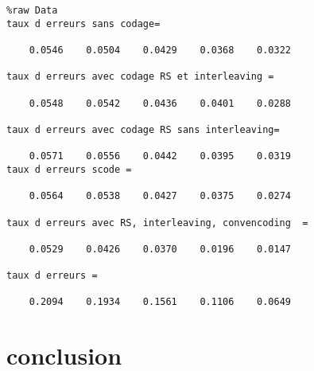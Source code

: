 \documentclass[a4paper,11pt]{article}
\begin{document}
\begin{verbatim}
%raw Data
taux d erreurs sans codage=

    0.0546    0.0504    0.0429    0.0368    0.0322

taux d erreurs avec codage RS et interleaving =

    0.0548    0.0542    0.0436    0.0401    0.0288

taux d erreurs avec codage RS sans interleaving=

    0.0571    0.0556    0.0442    0.0395    0.0319
taux d erreurs scode =

    0.0564    0.0538    0.0427    0.0375    0.0274

taux d erreurs avec RS, interleaving, convencoding  =

    0.0529    0.0426    0.0370    0.0196    0.0147

taux d erreurs =

    0.2094    0.1934    0.1561    0.1106    0.0649
\end{verbatim}


\begin{center}
\end{center}
\section{conclusion}
\end{document}
